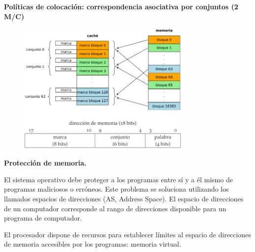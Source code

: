 \documentclass{article}
\begin{document}
\newpage

\textbf{Políticas de colocación: correspondencia asociativa por conjuntos (2 M/C)}
\begin{figure}[h]
\centering
\includegraphics[scale=1,width=85mm]{porconjuntos.png}
\end{figure}

\textbf{Protección de memoria.}

El sistema operativo debe proteger a los programas entre sí y a él mismo de programas maliciosos o erróneos. Este problema se soluciona utilizando los llamados espacios de direcciones (AS, Address Space). El espacio de direcciones de un computador corresponde al rango de direcciones disponible para un programa de computador.

El procesador dispone de recursos para establecer límites al espacio de direcciones de memoria accesibles por los programas: memoria virtual.
\end{document}
